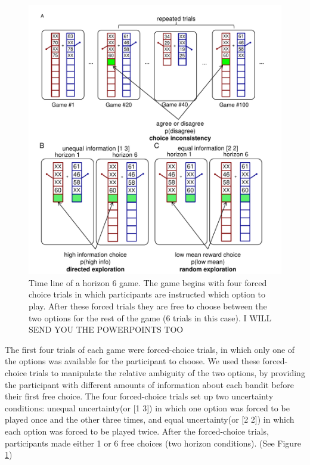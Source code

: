 \documentclass[12pt]{article}
\begin{document}
	\begin{figure}[H]
		\begin{center}
			\includegraphics[width=\textwidth]{figures/taskfigb.pdf}
			\caption{Time line of a horizon 6 game.  The game begins with four forced choice trials in which participants are instructed which option to play.   After these forced trials they are free to choose between the two options for the rest of the game (6 trials in this case).
			I WILL SEND YOU THE POWERPOINTS TOO}
			\label{fig:taskfigb}
		\end{center}
	\end{figure}
	
	The first four trials of each game were forced-choice trials, in which only one of the options was available for the participant to choose. We used these forced-choice trials to manipulate the relative ambiguity of the two options, by providing the participant with different amounts of information about each bandit before their first free choice. The four forced-choice trials set up two uncertainty conditions: unequal uncertainty(or [1 3]) in which one option was forced to be played once and the other three times, and equal uncertainty(or [2 2]) in which each option was forced to be played twice. After the forced-choice trials, participants made either 1 or 6 free choices (two horizon conditions). (See Figure \ref{fig:taskfigb})	 
	
\end{document}
